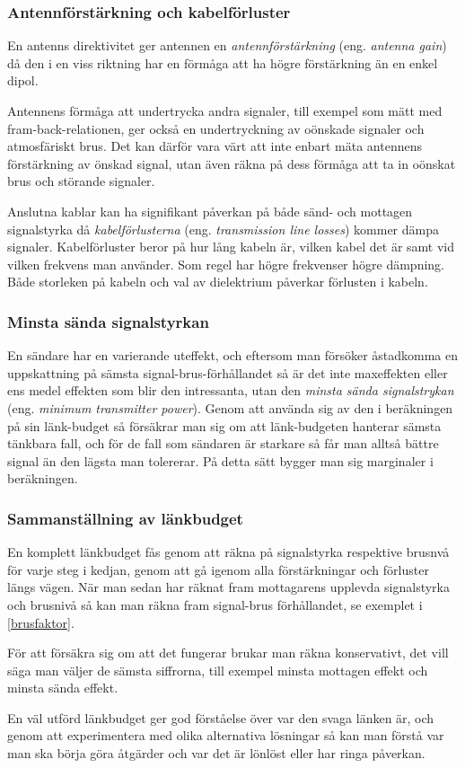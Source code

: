 \subsubsection{Antennförstärkning och kabelförluster}

En antenns direktivitet ger antennen en \emph{antennförstärkning} (eng.
\emph{antenna gain}) då den i en viss riktning har en förmåga att ha högre
förstärkning än en enkel dipol.

Antennens förmåga att undertrycka andra signaler, till exempel som mätt med
fram-back-relationen, ger också en undertryckning av oönskade signaler och
atmosfäriskt brus.
Det kan därför vara värt att inte enbart mäta antennens förstärkning av
önskad signal, utan även räkna på dess förmåga att ta in oönskat brus och
störande signaler.

Anslutna kablar kan ha signifikant påverkan på både sänd- och mottagen
signalstyrka då \emph{kabelförlusterna} (eng. \emph{transmission line losses})
kommer dämpa signaler.
Kabelförluster beror på hur lång kabeln är, vilken kabel det är samt vid
vilken frekvens man använder.
Som regel har högre frekvenser högre dämpning.
Både storleken på kabeln och val av dielektrium påverkar förlusten i kabeln.

\subsubsection{Minsta sända signalstyrkan}

En sändare har en varierande uteffekt, och eftersom man försöker åstadkomma en
uppskattning på sämsta signal-brus-förhållandet så är det inte maxeffekten
eller ens medel effekten som blir den intressanta, utan den \emph{minsta sända
signalstrykan} (eng. \emph{minimum transmitter power}).
Genom att använda sig av den i beräkningen på sin länk-budget så försäkrar man
sig om att länk-budgeten hanterar sämsta tänkbara fall, och för de fall som
sändaren är starkare så får man alltså bättre signal än den lägsta man
tolererar.
På detta sätt bygger man sig marginaler i beräkningen.

\subsubsection{Sammanställning av länkbudget}

En komplett länkbudget fås genom att räkna på signalstyrka respektive brusnvå
för varje steg i kedjan, genom att gå igenom alla förstärkningar och förluster
längs vägen.
När man sedan har räknat fram mottagarens upplevda signalstyrka och brusnivå så
kan man räkna fram signal-brus förhållandet, se exemplet i \ref{brusfaktor}.

För att försäkra sig om att det fungerar brukar man räkna konservativt, det
vill säga man väljer de sämsta siffrorna, till exempel minsta mottagen effekt
och minsta sända effekt.

En väl utförd länkbudget ger god förståelse över var den svaga länken är,
och genom att experimentera med olika alternativa lösningar så kan man
förstå var man ska börja göra åtgärder och var det är lönlöst eller har
ringa påverkan.
